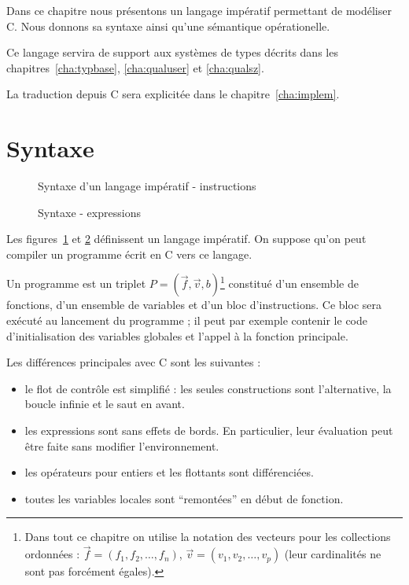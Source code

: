 Dans ce chapitre nous présentons un langage impératif permettant de modéliser C.
Nous donnons sa syntaxe ainsi qu'une sémantique opérationelle.

Ce langage servira de support aux systèmes de types décrits dans les
chapitres~\ref{cha:typbase}, \ref{cha:qualuser} et \ref{cha:qualsz}.

La traduction depuis C sera explicitée dans le chapitre~\ref{cha:implem}.

\section{Syntaxe}

\begin{figure}

\caption{Syntaxe d'un langage impératif - instructions}
\label{fig:syntx}
\end{figure}

\begin{figure}

\caption{Syntaxe - expressions}
\label{fig:syntx-data}
\end{figure}


Les figures~\ref{fig:syntx} et \ref{fig:syntx-data} définissent un langage
impératif. On suppose qu'on peut compiler un programme écrit en C vers ce
langage.

Un programme est un triplet $P = (\vec{f}, \vec{v}, b)$\footnote{Dans tout ce
chapitre on utilise la notation des vecteurs pour les collections ordonnées :
$\vec{f} = (f_1, f_2, …, f_n)$, $\vec{v} = (v_1, v_2, …, v_p)$ (leur
cardinalités ne sont pas forcément égales).} constitué d'un ensemble de
fonctions, d'un ensemble de variables et d'un bloc d'instructions. Ce bloc sera
exécuté au lancement du programme ; il peut par exemple contenir le code
d'initialisation des variables globales et l'appel à la fonction principale.


Les différences principales avec C sont les suivantes :

\begin{itemize}
\item
  le flot de contrôle est simplifié : les seules constructions sont
  l'alternative, la boucle infinie et le saut en avant.
\item
  les expressions sont sans effets de bords. En particulier, leur
  évaluation peut être faite sans modifier l'environnement.
\item
  les opérateurs pour entiers et les flottants sont différenciées.
\item
  toutes les variables locales sont ``remontées'' en début de fonction.
\end{itemize}

